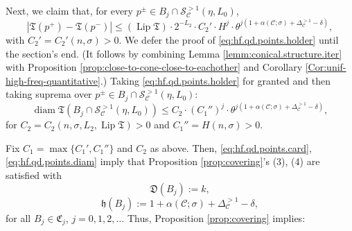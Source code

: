 \documentclass[11pt, letterpaper, reqno]{amsart}
\numberwithin{equation}{section}
\theoremstyle{remark}
\newcommand{\cC}{\mathcal{C}}
\newcommand{\cS}{\mathcal{S}}
\newcommand{\frT}{\mathfrak{T}}
\begin{document}
Next, we claim that, for every $p^\pm \in B_j \cap \cS^{>1}_\cC(\eta, L_0)$,
\begin{equation} \label{eq:hf.qd.points.holder}
    |\frT(p^+) - \frT(p^-)| \leq (\operatorname{Lip} \frT) \cdot 2^{-L_2} \cdot C_2' \cdot H^j \cdot \theta^{j(1 + \alpha(\cC; \sigma) + \Delta^{>1}_\cC - \delta)},
\end{equation}
with $C_2' = C_2'(n, \sigma) > 0$. We defer the proof of \eqref{eq:hf.qd.points.holder} until the section's end. (It follows by combining Lemma \ref{lemm:conical.structure.iter} with Proposition  \ref{prop:close-to-cone-close-to-eachother} and Corollary \ref{Cor:unif-high-freq-quantitative}.) Taking \eqref{eq:hf.qd.points.holder} for granted and then taking suprema over $p^\pm \in B_j \cap \cS^{>1}_\cC(\eta, L_0)$:
\begin{equation} \label{eq:hf.qd.points.diam}
    \operatorname{diam} \frT(B_j \cap \cS^{>1}_\cC(\eta, L_0)) \leq C_2 \cdot (C_1'')^j \cdot \theta^{j(1 + \alpha(\cC; \sigma) + \Delta^{>1}_\cC - \delta)},
\end{equation}
for $C_2 = C_2(n, \sigma, L_2, \operatorname{Lip} \frT) > 0$ and $C_1'' = H(n, \sigma) > 0$.
  
Fix $C_1 = \max \{ C_1', C_1'' \}$ and $C_2$ as above. Then, \eqref{eq:hf.qd.points.card}, \eqref{eq:hf.qd.points.diam} imply that Proposition \ref{prop:covering}'s (3), (4) are satisfied with
\[ \mathfrak{D}(B_j) := k, \]
\[ \mathfrak{h}(B_j) := 1 + \alpha(\cC; \sigma) + \Delta^{>1}_{\cC} - \delta, \]
for all $B_j \in \mathfrak{C}_j$, $j = 0, 1, 2, \ldots$ Thus, Proposition \ref{prop:covering} implies:
\end{document}
